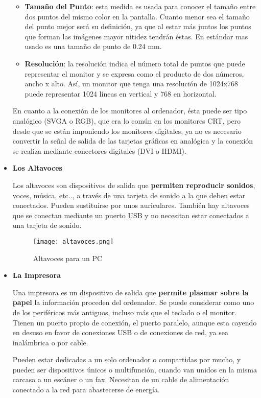 \begin{itemize}
\begin{itemize}
        \item \textbf{Tamaño del Punto}: esta medida es usada para conocer el tamaño entre dos puntos del mismo color en la pantalla. Cuanto menor sea el tamaño del punto mejor será su definición, ya que al estar más juntos los puntos que forman las imágenes mayor nitidez tendrán éstas. En estándar mas usado es una tamaño de punto de 0.24 mm.

        \item \textbf{Resolución}: la resolución indica el número total de puntos que puede representar el monitor y se expresa como el producto de dos números, ancho x alto. Así, un monitor que tenga una resolución de 1024x768 puede representar 1024 líneas en vertical y 768 en horizontal.
    \end{itemize}

    En cuanto a la conexión de los monitores al ordenador, ésta puede ser tipo analógico (SVGA o RGB), que era lo común en los monitores CRT, pero desde que se están imponiendo los monitores digitales, ya no es necesario convertir la señal de salida de las tarjetas gráficas en analógica y la conexión se realiza mediante conectores digitales (DVI o HDMI).

    \item \textbf{Los Altavoces}

    Los altavoces son dispositivos de salida que \textbf{permiten reproducir sonidos}, voces, música, etc.., a través de una tarjeta de sonido a la que deben estar conectados. Pueden sustituirse por unos auriculares. También hay altavoces que se conectan mediante un puerto USB y no necesitan estar conectados a una tarjeta de sonido.

    \begin{figure}[ht]
        \centering
        \texttt{[image: altavoces.png]}
        \caption{Altavoces para un PC}
    \end{figure}

    \item \textbf{La Impresora}

    Una impresora es un dispositivo de salida que \textbf{permite plasmar sobre la papel }la información proceden del ordenador. Se puede considerar como uno de los periféricos más antiguos, incluso más que el teclado o el monitor. Tienen un puerto propio de conexión, el puerto paralelo, aunque esta cayendo en desuso en favor de conexiones USB o de conexiones de red, ya sea inalámbrica o por cable.

    Pueden estar dedicadas a un solo ordenador o compartidas por mucho, y pueden ser dispositivos únicos o multifunción, cuando van unidos en la misma carcasa a un escáner o un fax. Necesitan de un cable de alimentación conectado a la red para abastecerse de energía.


\end{itemize}
